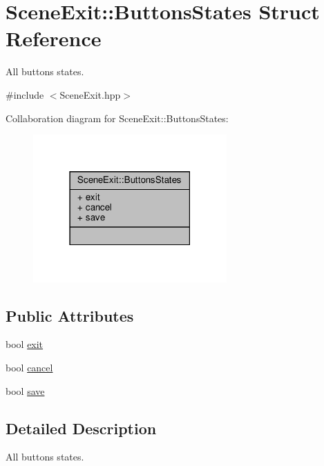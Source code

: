 \hypertarget{struct_scene_exit_1_1_buttons_states}{}\section{Scene\+Exit\+:\+:Buttons\+States Struct Reference}
\label{struct_scene_exit_1_1_buttons_states}


All buttons states.  




{\ttfamily \#include $<$Scene\+Exit.\+hpp$>$}



Collaboration diagram for Scene\+Exit\+:\+:Buttons\+States\+:
\nopagebreak
\begin{figure}[H]
\begin{center}
\leavevmode
\includegraphics[width=210pt]{struct_scene_exit_1_1_buttons_states__coll__graph}
\end{center}
\end{figure}
\subsection*{Public Attributes}
\begin{DoxyCompactItemize}
\item 
bool \hyperlink{struct_scene_exit_1_1_buttons_states_a035e7a8f4ed3945bd01f050a1589998b}{exit}
\item 
bool \hyperlink{struct_scene_exit_1_1_buttons_states_a038f086f52088417dcbb86534a23bdaf}{cancel}
\item 
bool \hyperlink{struct_scene_exit_1_1_buttons_states_a270d56195b6cee3befa788006aa40371}{save}
\end{DoxyCompactItemize}


\subsection{Detailed Description}
All buttons states. 

